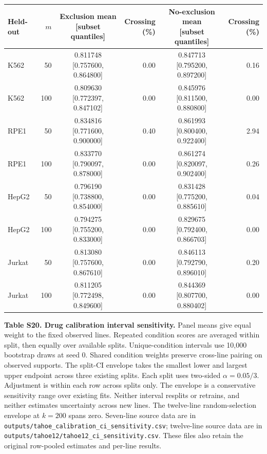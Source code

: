 \documentclass[12pt]{article}
\begin{document}
\begin{singlespace}
\vspace{6pt}
{\scriptsize
\setlength{\tabcolsep}{3pt}
\renewcommand{\arraystretch}{1.1}
\begin{tabular}{@{}lrcrcr@{}}
\toprule
Held-out & $m$ & \makecell{Exclusion mean\\{[subset quantiles]}} & \makecell{Crossing\\(\%)} & \makecell{No-exclusion mean\\{[subset quantiles]}} & \makecell{Crossing\\(\%)} \\
\midrule
K562 & 50 & 0.811748 [0.757600, 0.864800] & 0.00 & 0.847713 [0.795200, 0.897200] & 0.16 \\
K562 & 100 & 0.809630 [0.772397, 0.847102] & 0.00 & 0.845976 [0.811500, 0.880800] & 0.00 \\
RPE1 & 50 & 0.834816 [0.771600, 0.900000] & 0.40 & 0.861993 [0.800400, 0.922400] & 2.94 \\
RPE1 & 100 & 0.833770 [0.790097, 0.878000] & 0.00 & 0.861274 [0.820097, 0.902400] & 0.26 \\
HepG2 & 50 & 0.796190 [0.738800, 0.854000] & 0.00 & 0.831428 [0.775200, 0.885610] & 0.04 \\
HepG2 & 100 & 0.794275 [0.755200, 0.833000] & 0.00 & 0.829675 [0.792400, 0.866703] & 0.00 \\
Jurkat & 50 & 0.813080 [0.757600, 0.867610] & 0.00 & 0.846113 [0.792790, 0.896010] & 0.20 \\
Jurkat & 100 & 0.811205 [0.772498, 0.849600] & 0.00 & 0.844369 [0.807700, 0.880402] & 0.00 \\
\bottomrule
\end{tabular}
}

\clearpage

\noindent\textbf{Table S20. Drug calibration interval sensitivity.} Panel means give equal weight to the fixed observed lines. Repeated condition scores are averaged within split, then equally over available splits. Unique-condition intervals use 10,000 bootstrap draws at seed 0. Shared condition weights preserve cross-line pairing on observed supports. The split-CI envelope takes the smallest lower and largest upper endpoint across three existing splits. Each split uses two-sided $\alpha = 0.05/3$. Adjustment is within each row across splits only. The envelope is a conservative sensitivity range over existing fits. Neither interval resplits or retrains, and neither estimates uncertainty across new lines. The twelve-line random-selection envelope at $k = 200$ spans zero. Seven-line source data are in \texttt{outputs/tahoe\_calibration\_ci\_sensitivity.csv}; twelve-line source data are in \texttt{outputs/tahoe12/tahoe12\_ci\_sensitivity.csv}. These files also retain the original row-pooled estimates and per-line results.


\end{singlespace}
\end{document}
